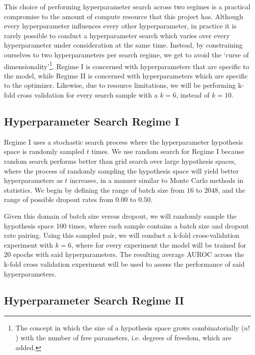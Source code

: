 This choice of performing hyperparameter search across two regimes is a practical compromise to the amount of compute resource that this project has. Although every hyperparameter influences every other hyperparameter, in practice it is rarely possible to conduct a hyperparameter search which varies over every hyperparameter under consideration at the same time. Instead, by constraining ourselves to two hyperparameters per search regime, we get to avoid the \enquote*{curse of dimensionality}\footnote{The concept in which the size of a hypothesis space grows combinatorially (\(n!\)) with the number of free parameters, i.e. degrees of freedom, which are added.}. Regime I is concerned with hyperparameters that are specific to the model, while Regime II is concerned with hyperparameters which are specific to the optimizer. Likewise, due to resource limitations, we will be performing k-fold cross validation for every search sample with a \(k=6\), instead of \(k=10\).

\subsection{Hyperparameter Search Regime I}\label{sec:regime-i}

Regime I uses a stochastic search process where the hyperparameter hypothesis space is randomly sampled \(t\) times. We use random search for Regime I because random search performs better than grid search over large hypothesis spaces, where the process of randomly sampling the hypothesis space will yield better hyperparameters as \(t\) increases, in a manner similar to Monte Carlo methods in statistics. \autocite{randomsearch} We begin by defining the range of batch size from \(16\) to \(2048\), and the range of possible dropout rates from \(0.00\) to \(0.50\).

Given this domain of batch size versus dropout, we will randomly sample the hypothesis space 100 times, where each sample contains a batch size and dropout rate pairing. Using this sampled pair, we will conduct a k-fold cross-validation experiment with \(k=6\), where for every experiment the model will be trained for \(20\) epochs with said hyperparameters. The resulting average AUROC across the k-fold cross validation experiment will be used to assess the performance of said hyperparameters.

\subsection{Hyperparameter Search Regime II}\label{sec:regime-ii}

